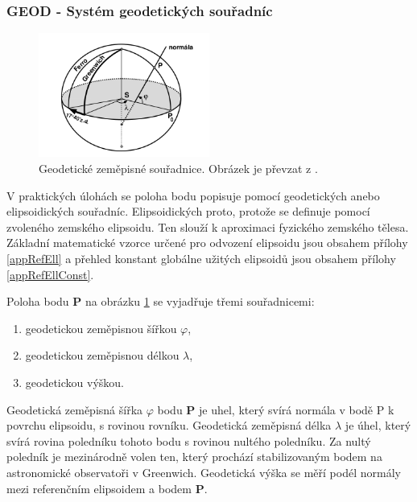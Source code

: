 \subsubsection{GEOD - Systém geodetických souřadníc}

\begin{figure}[ht!]
\begin{center}
\includegraphics[width=0.50\textwidth]{FIG/geod_cimb}
\caption{Geodetické zeměpisné souřadnice. Obrázek je převzat z \cite{Cimbalnik1997}.}
\label{fig:geod}
\end{center}
\end{figure}

V praktických úlohách se poloha bodu popisuje pomocí geodetických anebo elipsoidických souřadníc. Elipsoidických proto, protože se definuje pomocí zvoleného zemského elipsoidu. Ten slouží k aproximaci fyzického zemského tělesa. Základní matematické vzorce určené pro odvození elipsoidu jsou obsahem přílohy \ref{appRefEll} a přehled konstant globálne užitých elipsoidů jsou obsahem přílohy \ref{appRefEllConst}.

Poloha bodu \textbf{P} na obrázku \ref{fig:geod} se vyjadřuje třemi souřadnicemi:

\begin{enumerate}
\item geodetickou zeměpisnou šířkou $\varphi$,
\item geodetickou zeměpisnou délkou $\lambda$,
\item geodetickou výškou.
\end{enumerate} 

Geodetická zeměpisná šířka $\varphi$ bodu \textbf{P} je uhel, který svírá normála v bodě P k povrchu elipsoidu, s rovinou rovníku. Geodetická zeměpisná délka $\lambda$ je úhel, který svírá rovina poledníku tohoto bodu s rovinou nultého poledníku. Za nultý poledník je mezinárodně volen ten, který prochází stabilizovaným bodem na astronomické observatoři v Greenwich. Geodetická výška se měří podél normály mezi referenčním elipsoidem a bodem \textbf{P}.

